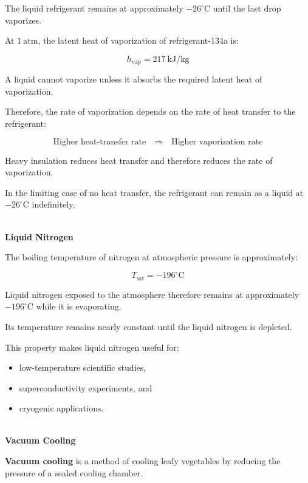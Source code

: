 \documentclass[12pt]{article}
\begin{document}
The liquid refrigerant remains at approximately $-26^\circ\mathrm{C}$ until the last drop vaporizes.

At $1~\mathrm{atm}$, the latent heat of vaporization of refrigerant-134a is:

\begin{equation*}
h_{\mathrm{vap}}=217~\mathrm{kJ/kg}
\end{equation*}

A liquid cannot vaporize unless it absorbs the required latent heat of vaporization.

Therefore, the rate of vaporization depends on the rate of heat transfer to the refrigerant:

\begin{equation*}
\boxed{\text{Higher heat-transfer rate}
\quad\Rightarrow\quad
\text{Higher vaporization rate}}
\end{equation*}

Heavy insulation reduces heat transfer and therefore reduces the rate of vaporization.

In the limiting case of no heat transfer, the refrigerant can remain as a liquid at $-26^\circ\mathrm{C}$ indefinitely.

\textbf{\\ Liquid Nitrogen}

The boiling temperature of nitrogen at atmospheric pressure is approximately:

\begin{equation*}
T_{\mathrm{sat}}=-196^\circ\mathrm{C}
\end{equation*}

Liquid nitrogen exposed to the atmosphere therefore remains at approximately $-196^\circ\mathrm{C}$ while it is evaporating.

Its temperature remains nearly constant until the liquid nitrogen is depleted.

This property makes liquid nitrogen useful for:
\begin{itemize}
    \item low-temperature scientific studies,
    \item superconductivity experiments, and
    \item cryogenic applications.
\end{itemize}

\textbf{\\ Vacuum Cooling}

\textbf{Vacuum cooling} is a method of cooling leafy vegetables by reducing the pressure of a sealed cooling chamber.
\end{document}
